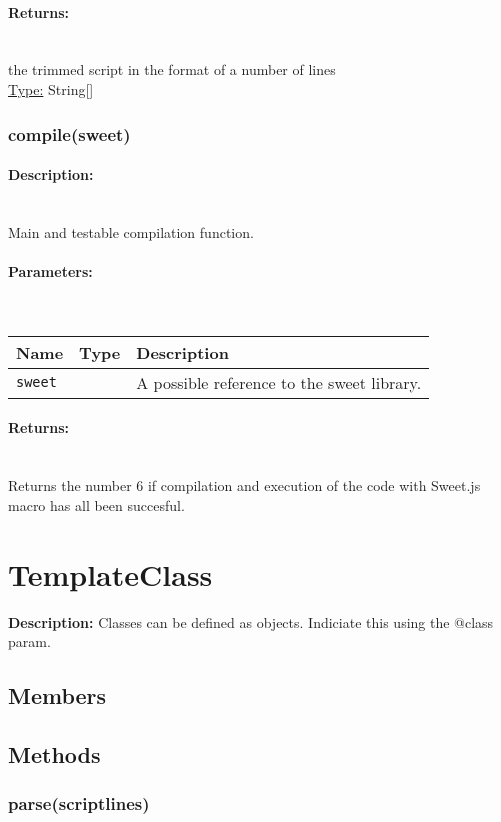 \paragraph{Returns:} \hfill \\ 
the trimmed script in the format of a number of lines\\ 
\underline{Type:} String[]
\subsubsection{compile(sweet)} 
\paragraph{Description:} \hfill \\ 
Main and testable compilation function.
\paragraph{Parameters:} \hfill \\ 
\begin{tabular}{|l|l|l|}
\hline
\textbf{Name} & \textbf{Type} & \textbf{Description} \\ 
\hline
\texttt{sweet} &  & A possible reference to the sweet library.\\ 
\hline
\end{tabular}
\paragraph{Returns:} \hfill \\ 
Returns the number 6 if compilation and execution of the code with Sweet.js macro has all been succesful.\\ 
\section{TemplateClass} 
\textbf{Description: }Classes can be defined as objects. Indiciate this using the @class param.
\subsection{Members} 
\subsection{Methods} 
\subsubsection{parse(scriptlines)} 
